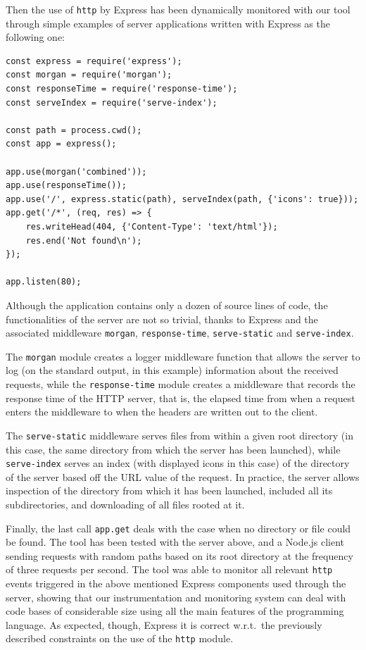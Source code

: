 Then the use of \lstinline{http} by Express has been dynamically monitored with our tool through simple
examples of server applications written with Express as the following one:
\begin{lstlisting}
const express = require('express');
const morgan = require('morgan');
const responseTime = require('response-time');
const serveIndex = require('serve-index');

const path = process.cwd();
const app = express();

app.use(morgan('combined'));
app.use(responseTime());
app.use('/', express.static(path), serveIndex(path, {'icons': true}));
app.get('/*', (req, res) => {
    res.writeHead(404, {'Content-Type': 'text/html'});
    res.end('Not found\n');
});

app.listen(80);
\end{lstlisting}
Although the application contains only a dozen of source lines of code, the
functionalities of the server are not so trivial, thanks to Express and the
associated middleware \lstinline{morgan}, \lstinline{response-time}, \lstinline{serve-static} and
\lstinline{serve-index}.

The \lstinline{morgan} module creates a logger middleware function that allows the server to log (on the standard output, in this example)
information about the received requests, while the \lstinline{response-time} module
creates a middleware that records the response time of the HTTP server, that is, the elapsed time from when a
request enters the middleware to when the headers are written out to the client.

The  \lstinline{serve-static} middleware serves files from within a given root directory (in this case, the same directory
from which the server has been launched), while \lstinline{serve-index} serves an index (with displayed icons in this case)
of the directory of the server based off the URL value of the request. In practice, the server allows inspection of the directory
from which it has been launched, included all its subdirectories, and downloading of all files rooted at it. 

Finally, the last call \lstinline{app.get} deals with the case when no directory or file could be found.
The tool has been tested with the server above, and a Node.js client sending requests with random  paths based on its root directory at the frequency of three requests per second.
The tool was able to monitor all relevant \lstinline{http} events triggered in the above mentioned Express components used through the server, showing that our instrumentation and monitoring system can deal with code bases of considerable size using all the main features of the programming language.
As expected, though, Express it is correct w.r.t.\ the previously described constraints on the use of the \lstinline{http} module.

